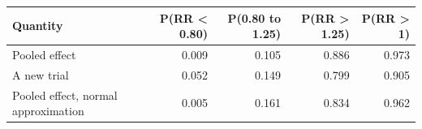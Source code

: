 
\begin{tabular}{lrrrr}
\toprule
Quantity & P(RR < 0.80) & P(0.80 to 1.25) & P(RR > 1.25) & P(RR > 1)\\
\midrule
Pooled effect & 0.009 & 0.105 & 0.886 & 0.973\\
A new trial & 0.052 & 0.149 & 0.799 & 0.905\\
Pooled effect, normal approximation & 0.005 & 0.161 & 0.834 & 0.962\\
\bottomrule
\end{tabular}
